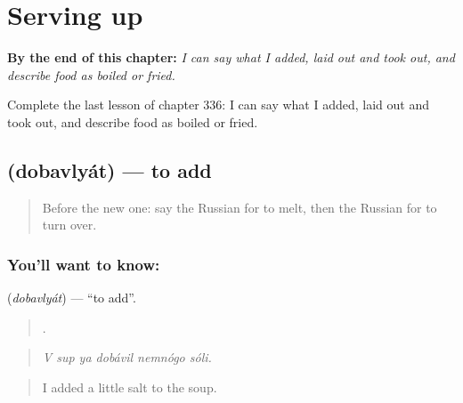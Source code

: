 
\chapter{Serving up}
\label{ch:ru-serving-up}

\begin{chapteropening}
\textbf{By the end of this chapter:} \emph{I can say what I added, laid out and took out, and describe food as boiled or fried.}

Complete the last lesson of chapter 336: I can say what I added, laid out and took out, and describe food as boiled or fried.
\end{chapteropening}

\section[\texorpdfstring{\ru{добавлять} (dobavlyát)}{добавлять (dobavlyát)}]{ (dobavlyát) — to add}

\label{lesson:RU-C336-dobavlyat}



\begin{quote}
Before the new one: say the Russian for to melt, then the Russian for to turn over.
\end{quote}

\subsection*{You'll want to know: }
\textbf{} (\emph{dobavlyát}) — \textquotedblleft{}to add\textquotedblright{}.

\begin{quote}
     .
\end{quote}

\begin{quote}
\emph{V sup ya dobávil nemnógo sóli.}
\end{quote}

\begin{quote}
I added a little salt to the soup.
\end{quote}

